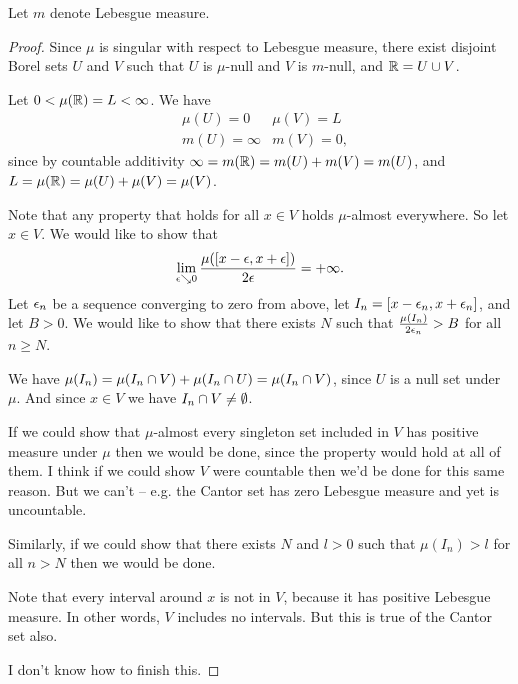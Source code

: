





Let $m$ denote Lebesgue measure.

\begin{proof}
  Since $\mu$ is singular with respect to Lebesgue measure, there exist disjoint Borel sets $U$ and $V$ such
  that $U$ is $\mu$-null and $V$ is $m$-null, and $\mathbb{R} = U \cup V$.

  Let $0 < \mu(\mathbb{R}) = L < \infty$. We have
  \begin{align*}
    &\mu(U) = 0     & \mu(V) = L \\
    &m(U) = \infty & m(V) = 0,
  \end{align*}
  since by countable additivity $\infty = m(\mathbb{R}) = m(U) + m(V) = m(U)$,
  and $L = \mu(\mathbb{R}) = \mu(U) + \mu(V) = \mu(V)$.

  Note that any property that holds for all $x \in V$ holds $\mu$-almost everywhere. So let $x \in V$. We would
  like to show that
  \begin{align*}
    \lim_{\eps \searrow 0} \frac{\mu([x - \eps, x + \eps])}{2\eps} = +\infty.
  \end{align*}
  Let $\epsilon_n$ be a sequence converging to zero from above, let $I_n = [x - \epsilon_n, x + \epsilon_n]$, and
  let $B > 0$. We would like to show that there exists $N$ such that $\frac{\mu(I_n)}{2\epsilon_n} > B$ for
  all $n \geq N$.

  We have $\mu(I_n) = \mu(I_n \cap V) + \mu(I_n \cap U) = \mu(I_n \cap V)$, since $U$ is a null set
  under $\mu$. And since $x \in V$ we have $I_n \cap V \neq \emptyset$.

  If we could show that $\mu$-almost every singleton set included in $V$ has positive measure under $\mu$ then
  we would be done, since the property would hold at all of them. I think if we could show $V$ were countable
  then we'd be done for this same reason. But we can't -- e.g. the Cantor set has zero Lebesgue measure and yet
  is uncountable.

  Similarly, if we could show that there exists $N$ and $l > 0$ such that $\mu(I_n) > l$ for all $n > N$ then
  we would be done.

  Note that every interval around $x$ is not in $V$, because it has positive Lebesgue measure. In other
  words, $V$ includes no intervals. But this is true of the Cantor set also.

  I don't know how to finish this.
\end{proof}


